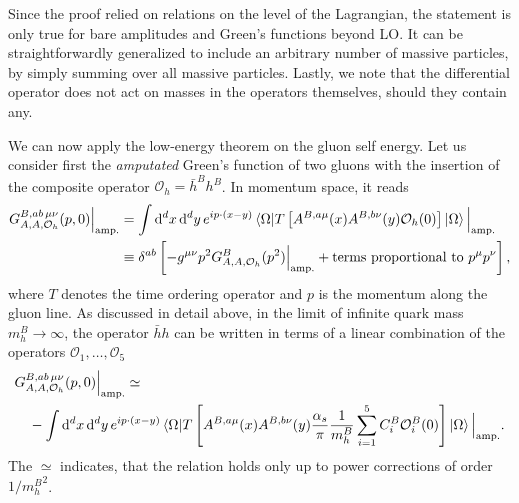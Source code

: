 Since the proof relied on relations on the level of the Lagrangian, the statement is only true for bare amplitudes and Green's functions beyond \acs{LO}. It can be straightforwardly generalized to include an arbitrary number of massive particles, by simply summing over all massive particles. Lastly, we note that the differential operator does not act on masses in the operators themselves, should they contain any.

We can now apply the low-energy theorem on the gluon self energy. Let us consider first the \textit{amputated} Green's function of two gluons with the insertion of the composite operator $\mathcal{O}_h = \bar{h}^B h^B$. In momentum space, it reads
\begin{equation}
\begin{split}
G_{A,A,\mathcal{O}_h}^{B,ab\,\mu\nu} (p, 0) \Big \vert_{\text{amp.}} &=  \int \mathrm{d}^d x\, \mathrm{d}^d y\, e^{ip \cdot (x - y)} \braket{\Omega|T\left[ A^{B,a\mu}(x) A^{B, b\nu}(y) \mathcal{O}_h(0) \right]|\Omega} \Big \vert_{\text{amp.}} \\
& \equiv \delta^{ab} \left[-g^{\mu\nu} p^2 G_{A,A,\mathcal{O}_h}^B(p^2)\Big \vert_{\text{amp.}} + \text{terms proportional to } p^\mu p^\nu \right],
\end{split}
\end{equation}
where $T$ denotes the time ordering operator and $p$ is the momentum along the gluon line. As discussed in detail above, in the limit of infinite quark mass $m_h^B \rightarrow \infty$, the operator $\bar{h}h$ can be written in terms of a linear combination of the operators $\mathcal{O}_1,\ldots , \mathcal{O}_5$
\begin{equation}
\begin{split}
&G_{A,A,\mathcal{O}_h}^{B,ab\, \mu\nu} (p, 0) \Big \vert_{\text{amp.}} \simeq \\
&\quad - \int \mathrm{d}^d x\, \mathrm{d}^d y\, e^{ip\cdot (x - y)} \braket{\Omega| T \left[ A^{B,a\mu}(x) A^{B, b \nu}(y) \frac{\alpha_s}{\pi} \frac{1}{m_h^B} \sum_{i=1}^5 C_i^B \mathcal{O}_i^B(0) \right]|\Omega} \Big \vert_{\text{amp.}}.
\end{split}
\end{equation}
The $\simeq$ indicates, that the relation holds only up to power corrections of order $1/{m_h^B}^2$.

